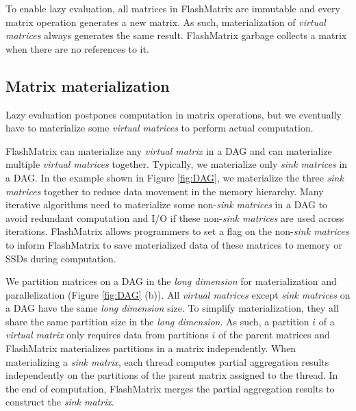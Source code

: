 To enable lazy evaluation, all matrices in FlashMatrix are immutable and every
matrix operation generates a new matrix. As such, materialization of
\textit{virtual matrices} always generates the same result. FlashMatrix
garbage collects a matrix when there are no references to it.

\subsection{Matrix materialization} \label{sec:materialize}
Lazy evaluation postpones computation in matrix operations, but we eventually
have to materialize some \textit{virtual matrices} to perform actual computation.

FlashMatrix can materialize any \textit{virtual matrix} in a DAG and
can materialize multiple \textit{virtual matrices} together. Typically, we
materialize only \textit{sink matrices} in a DAG. In the example shown in
Figure \ref{fig:DAG}, we materialize the three \textit{sink matrices} together
to reduce data movement in the memory hierarchy. Many iterative algorithms need
to materialize some non-\textit{sink matrices} in a DAG to avoid redundant
computation and I/O if these non-\textit{sink matrices} are used across
iterations. FlashMatrix allows programmers to set a flag on the
non-\textit{sink matrices} to inform FlashMatrix to save materialized data
of these matrices to memory or SSDs during computation.

We partition matrices on a DAG in the \textit{long dimension} for materialization
and parallelization (Figure \ref{fig:DAG} (b)). All \textit{virtual matrices}
except \textit{sink matrices} on a DAG have the same \textit{long dimension}
size. To simplify materialization, they all share the same partition size in
the \textit{long dimension}.
As such, a partition $i$ of a \textit{virtual matrix} only requires data from
partitions $i$ of the parent matrices and FlashMatrix materializes partitions
in a matrix independently. %
When materializing a \textit{sink matrix}, each thread computes partial
aggregation results independently on the partitions of the parent matrix
assigned to the thread. In the end of computation, FlashMatrix merges
the partial aggregation results to construct the \textit{sink matrix}.

